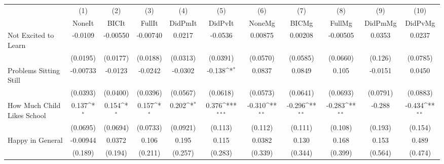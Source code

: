 {
\def\sym#1{\ifmmode^{#1}\else\(^{#1}\)\fi}
\begin{tabular}{l*{10}{c}}
\toprule
            &\multicolumn{1}{c}{(1)}&\multicolumn{1}{c}{(2)}&\multicolumn{1}{c}{(3)}&\multicolumn{1}{c}{(4)}&\multicolumn{1}{c}{(5)}&\multicolumn{1}{c}{(6)}&\multicolumn{1}{c}{(7)}&\multicolumn{1}{c}{(8)}&\multicolumn{1}{c}{(9)}&\multicolumn{1}{c}{(10)}\\
            &\multicolumn{1}{c}{NoneIt}&\multicolumn{1}{c}{BICIt}&\multicolumn{1}{c}{FullIt}&\multicolumn{1}{c}{DidPmIt}&\multicolumn{1}{c}{DidPvIt}&\multicolumn{1}{c}{NoneMg}&\multicolumn{1}{c}{BICMg}&\multicolumn{1}{c}{FullMg}&\multicolumn{1}{c}{DidPmMg}&\multicolumn{1}{c}{DidPvMg}\\
\midrule
Not Excited to Learn&     -0.0109         &    -0.00550         &    -0.00740         &      0.0217         &     -0.0536         &     0.00875         &     0.00208         &    -0.00505         &      0.0353         &      0.0237         \\
            &    (0.0195)         &    (0.0177)         &    (0.0188)         &    (0.0313)         &    (0.0391)         &    (0.0570)         &    (0.0585)         &    (0.0660)         &     (0.126)         &    (0.0785)         \\
\addlinespace
Problems Sitting Still&    -0.00733         &     -0.0123         &     -0.0242         &     -0.0302         &      -0.138\sym{*}  &      0.0837         &      0.0849         &       0.105         &     -0.0151         &      0.0450         \\
            &    (0.0393)         &    (0.0400)         &    (0.0396)         &    (0.0567)         &    (0.0618)         &    (0.0573)         &    (0.0641)         &    (0.0693)         &    (0.0791)         &    (0.0883)         \\
\addlinespace
How Much Child Likes School&       0.137\sym{*}  &       0.154\sym{*}  &       0.157\sym{*}  &       0.202\sym{*}  &       0.376\sym{***}&      -0.310\sym{**} &      -0.296\sym{**} &      -0.283\sym{**} &      -0.288         &      -0.434\sym{**} \\
            &    (0.0695)         &    (0.0694)         &    (0.0733)         &    (0.0921)         &     (0.113)         &     (0.112)         &     (0.111)         &     (0.108)         &     (0.193)         &     (0.154)         \\
\addlinespace
Happy in General&    -0.00944         &      0.0372         &       0.106         &       0.195         &       0.115         &      0.0382         &       0.130         &       0.168         &       0.153         &       0.489         \\
            &     (0.189)         &     (0.194)         &     (0.211)         &     (0.257)         &     (0.283)         &     (0.339)         &     (0.344)         &     (0.399)         &     (0.564)         &     (0.474)         \\
\bottomrule
\end{tabular}
}
